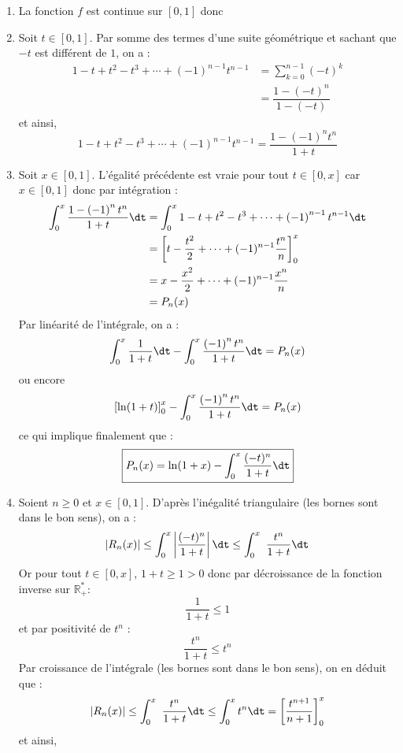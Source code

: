 \documentclass[a4paper,11pt]{report}
\newcommand{\enc}[1]{\begin{center}\fbox{#1}\end{center}}
\begin{document}
\begin{enumerate}
\item La fonction $f$ est continue sur $[0,1]$ donc
\enc{$L$ est bien définie}

\item Soit $t \in [0,1]$. Par somme des termes d'une suite géométrique et sachant que $-t$ est différent de $1$, on a :
\begin{align*}
1-t+t^{2}-t^{3}+\cdots+\left(  -1\right)  ^{n-1}t^{n-1} & = \sum_{k=0}^{n-1} (-t)^k \\
& = \dfrac{1-(-t)^n}{1-(-t)}
\end{align*}
et ainsi,
$$ \boxed{1-t+t^{2}-t^{3}+\cdots+\left(  -1\right)  ^{n-1}t^{n-1}   =\dfrac{1-\left(  -1\right)
^{n}t^{n}}{1+t}}$$

\item Soit $x \in [0,1]$. L'égalité précédente est vraie pour tout $t \in [0,x]$ car $x \in [0,1]$ donc par intégration :
\begin{align*}
\int_0^x \dfrac{1-\left(  -1\right)^{n}t^{n}}{1+t} \dt & = \int_0^x 1-t+t^{2}-t^{3}+\cdots+\left(  -1\right)  ^{n-1}t^{n-1} \dt \\
& = \left[ t - \dfrac{t^2}{2} + \cdots + (-1)^{n-1} \dfrac{t^n}{n} \right]_0^x \\
& = x - \dfrac{x^2}{2} + \cdots + (-1)^{n-1} \dfrac{x^n}{n} \\
& = P_n(x)
\end{align*}
Par linéarité de l'intégrale, on a :
$$ \int_0^x \dfrac{1}{1+t} \dt - \int_0^x \dfrac{\left(  -1\right)^{n}t^{n}}{1+t} \dt = P_n(x)$$
ou encore 
$$ \left[\ln(1+t)\right]_0^x - \int_0^x \dfrac{\left(  -1\right)^{n}t^{n}}{1+t} \dt = P_n(x)$$
ce qui implique finalement que :
$$ \boxed{P_n(x) = \ln(1+x) - \int_0^x \dfrac{(-t)^{n}}{1+t} \dt }$$



\item Soient $n \geq 0$ et $x \in [0,1]$. D'après l'inégalité triangulaire (les bornes sont dans le bon sens), on a :
$$ \vert R_n(x) \vert \leq \int_0^x \left\vert \dfrac{(-t)^n}{1+t} \right\vert \dt  \leq \int_0^x \ \dfrac{t^n}{1+t} \dt$$
Or pour tout $t \in [0,x]$, $1+t \geq 1>0$ donc par décroissance de la fonction inverse sur $\mathbb{R}_+^{*}$:
$$ \dfrac{1}{1+t} \leq 1$$
et par positivité de $t^n$ :
$$ \dfrac{t^n}{1+t} \leq t^n$$
Par croissance de l'intégrale (les bornes sont dans le bon sens), on en déduit que :
$$  \vert R_n(x) \vert \leq \int_0^x \ \dfrac{t^n}{1+t} \dt \leq \int_0^x t^n \dt = \left[\dfrac{t^{n+1}}{n+1} \right]_0^x$$
et ainsi,


\end{enumerate}
\end{document}
